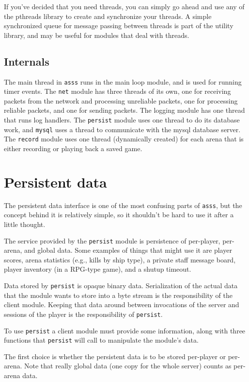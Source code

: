 \documentclass{article}
\newcommand{\asss}{\texttt{asss}}
\begin{document}
If you've decided that you need threads, you can simply go ahead and use
any of the pthreads library to create and synchronize your threads. A
simple synchronized queue for message passing between threads is part of
the utility library, and may be useful for modules that deal with
threads.


\subsection{Internals}

The main thread in \asss{} runs in the main loop module, and is used for
running timer events. The \verb/net/ module has three threads of its
own, one for receiving packets from the network and processing
unreliable packets, one for processing reliable packets, and one for
sending packets. The logging module has one thread that runs log
handlers. The \verb/persist/ module uses one thread to do its database
work, and \verb/mysql/ uses a thread to communicate with the mysql
database server. The \verb/record/ module uses one thread (dynamically
created) for each arena that is either recording or playing back a saved
game.


\section{Persistent data}

The persistent data interface is one of the most confusing parts of
\asss{}, but the concept behind it is relatively simple, so it shouldn't
be hard to use it after a little thought.

The service provided by the \verb/persist/ module is persistence of
per-player, per-arena, and global data. Some examples of things that
might use it are player scores, arena statistics (e.g., kills by ship
type), a private staff message board, player inventory (in a RPG-type
game), and a shutup timeout.

Data stored by \verb/persist/ is opaque binary data. Serialization of
the actual data that the module wants to store into a byte stream is the
responsibility of the client module. Keeping that data around between
invocations of the server and sessions of the player is the
responsibility of \verb/persist/.

To use \verb/persist/ a client module must provide some information,
along with three functions that \verb/persist/ will call to manipulate
the module's data.

The first choice is whether the persistent data is to be stored
per-player or per-arena. Note that really global data (one copy for the
whole server) counts as per-arena data.
\end{document}
